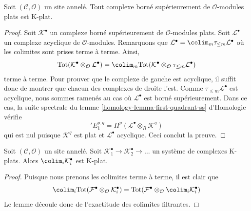 \begin{lemma}
\label{lemma-bounded-flat-K-flat}
Soit $(\mathcal{C}, \mathcal{O})$ un site annelé. Tout complexe borné
supérieurement de $\mathcal{O}$-modules plats est K-plat.
\end{lemma}

\begin{proof}
Soit $\mathcal{K}^\bullet$ un complexe borné supérieurement de
$\mathcal{O}$-modules plats. Soit $\mathcal{L}^\bullet$ un complexe acyclique
de $\mathcal{O}$-modules. Remarquons que
$\mathcal{L}^\bullet = \colim_m \tau_{\leq m}\mathcal{L}^\bullet$
où les colimites sont prises terme à terme. Ainsi,
$$
\text{Tot}(\mathcal{K}^\bullet \otimes_\mathcal{O} \mathcal{L}^\bullet)
=
\colim_m \text{Tot}(
\mathcal{K}^\bullet \otimes_\mathcal{O} \tau_{\leq m}\mathcal{L}^\bullet)
$$
terme à terme. Pour prouver que le complexe de gauche est acyclique, il suffit
donc de montrer que chacun des complexes de droite l'est. Comme
$\tau_{\leq m}\mathcal{L}^\bullet$ est acyclique, nous sommes ramenés au cas
où $\mathcal{L}^\bullet$ est borné supérieurement.
Dans ce cas, la suite spectrale du
lemme \ref{homology-lemma-first-quadrant-ss} d'Homologie vérifie
$$
{}'E_1^{p, q} = H^p(\mathcal{L}^\bullet \otimes_R \mathcal{K}^q)
$$
qui est nul puisque $\mathcal{K}^q$ est plat et $\mathcal{L}^\bullet$
acyclique. Ceci conclut la preuve.
\end{proof}

\begin{lemma}
\label{lemma-colimit-K-flat}
Soit $(\mathcal{C}, \mathcal{O})$ un site annelé.
Soit $\mathcal{K}_1^\bullet \to \mathcal{K}_2^\bullet \to \ldots$
un système de complexes K-plats.
Alors $\colim_i \mathcal{K}_i^\bullet$ est K-plat.
\end{lemma}

\begin{proof}
Puisque nous prenons les colimites terme à terme, il est clair que
$$
\colim_i \text{Tot}(
\mathcal{F}^\bullet \otimes_\mathcal{O} \mathcal{K}_i^\bullet)
=
\text{Tot}(\mathcal{F}^\bullet \otimes_\mathcal{O}
\colim_i \mathcal{K}_i^\bullet)
$$
Le lemme découle donc de l'exactitude des colimites filtrantes.
\end{proof}

